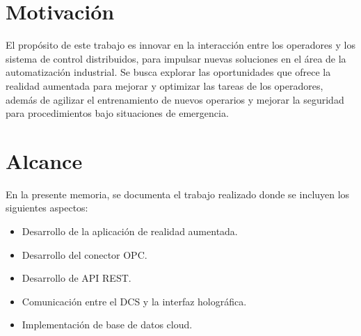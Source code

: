 \section{Motivación}
El propósito de este trabajo es innovar en la interacción entre los operadores y los sistema de control distribuidos, para impulsar nuevas soluciones en el área de la automatización industrial. Se busca explorar las oportunidades que ofrece la realidad aumentada para mejorar y optimizar las tareas de los operadores, además de agilizar el entrenamiento de nuevos operarios y mejorar la seguridad para procedimientos bajo situaciones de emergencia.


\section{Alcance}

En la presente memoria, se documenta el trabajo realizado donde se incluyen los siguientes aspectos:

\begin{itemize}	
\item Desarrollo de la aplicación de realidad aumentada.
\item Desarrollo del conector OPC.
\item Desarrollo de API REST.
\item Comunicación entre el DCS y la interfaz holográfica.
\item Implementación de base de datos cloud.
\end{itemize}